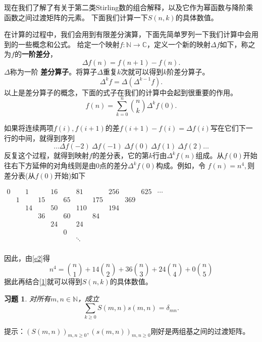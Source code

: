 \documentclass[a4paper,11pt]{article}
\newtheorem{ex}[thm]{习题}
\begin{document}
现在我们了解了有关于第二类Stirling数的组合解释，以及它作为幂函数与降阶乘函数之间过渡矩阵的元素。
下面我们计算一下$S(n,k)$的具体数值。

在计算的过程中，我们会用到有限差分演算，下面先简单罗列一下我们计算中会用到的一些概念和公式。
给定一个映射$f:\mathbb{N}\rightarrow\mathbb{C}$，定义一个新的映射$\Delta
f$如下，称之为$f$的{\bf 一阶差分}，
$$\Delta f(n)=f(n+1)-f(n).$$
$\Delta$称为一阶{\bf
差分算子}。将算子$\Delta$重复$k$次就可以得到$k$阶差分算子。
$$\Delta^k f=\Delta(\Delta^{k-1}f).$$
以上是差分算子的概念，下面的式子在我们的计算中会起到很重要的作用。
\begin{equation}
f(n)=\sum_{k=0}^n{n\choose k}\Delta^k f(0).\label{e2}
\end{equation}

如果将连续两项$f(i),f(i+1)$的差$f(i+1)-f(i)=\Delta
f(i)$写在它们下一行的中间，就得到序列
$$\ldots \Delta f(-2)\ \Delta f(-1)\ \Delta f(0)\ \Delta f(1)\ \Delta f(2)\ldots$$
反复这个过程，就得到映射$f$的差分表，它的第$k$行由$\Delta^k
f(n)$组成。从$f(0)$开始往右下方延伸的对角线则是由0点的差分$\Delta^k
f(0)$构成。例如，令 $f(n)=n^4,$则差分表(从$f(0)$开始)如下


$\begin{array}{cccccccccccc}
  0 &  & 1 &  & 16 &  & 81 &  & 256 &  & 625 & \cdots \\
   & 1 &  & 15 &  & 65 &  & 175 &  & 369 &  &  \\
   &  & 14 &  & 50 &  & 110 &  & 194 &  &  &  \\
   &  &  & 36 &  & 60 &  & 84 &  &  &  &  \\
   &  &  &  & 24 &  & 24 &  &  &  &  &  \\
   &  &  &  &  & 0 &  &  &  &  &  &  \\
   &  &  &  &  &  & \ddots &  &  &  &  &  \\
   &  &  &  &  &  &  &  &  &  &  &
\end{array}$

因此，由\ref{e2}得
$$n^4={n\choose 1}+14{n\choose 2}+36{n\choose 3}+24{n\choose 4}+0{n\choose 5}$$
据此再结合\ref{1}就可以得到$S(n,k)$的具体数值。

\begin{ex} 对所有$m,n\in\mathbb{N}$，成立
$$\sum_{k\geq 0}S(m,n)s(m,n)=\delta_{mn}.$$
\end{ex}

提示：$\left(S(m,n)\right)_{m,n\geq 0},\left(s(m,n)\right)_{m,n\geq
0}$刚好是两组基之间的过渡矩阵。
\end{document}
